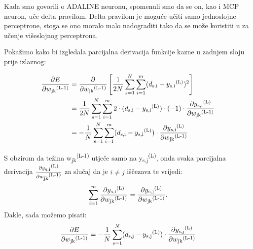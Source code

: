 \documentclass[times, utf8, zavrsni]{fer}
\begin{document}
Kada smo govorili o ADALINE neuronu, spomenuli smo da se on, kao i MCP neuron, uče delta pravilom. Delta pravilom je moguće učiti samo jednoslojne perceptrone, stoga se ono moralo malo nadograditi tako da se može koristiti u za učenje višeslojnog perceptrona.


Pokažimo kako bi izgledala parcijalna derivacija funkcije kazne u zadnjem sloju prije izlaznog:

\begin{align}
    \frac{\partial E}{\partial w\textsubscript{jk}\textsuperscript{(L-1)}} &= \frac{\partial}{\partial w\textsubscript{jk}\textsuperscript{(L-1)}}\left[\frac{1}{2N}\sum\limits_{s=1}^N\sum\limits_{i=1}^m(d\textsubscript{s,i} - y\textsubscript{s,i}\textsuperscript{(L)})^2\right] \\
    &= \frac{1}{2N}\sum\limits_{s=1}^N\sum\limits_{i=1}^m2\cdot{(d\textsubscript{s,i} - y\textsubscript{s,i}\textsuperscript{(L)}}) \cdot{(-1)} \cdot{\frac{\partial y\textsubscript{s,i}\textsuperscript{(L)}}{\partial w\textsubscript{jk}\textsuperscript{(L-1)}}} \\
    &= -\frac{1}{N}\sum\limits_{s=1}^N\sum\limits_{i=1}^m(d\textsubscript{s,i} - y\textsubscript{s,i}\textsuperscript{(L)})\cdot{\frac{\partial y\textsubscript{s,i}\textsuperscript{(L)}}{\partial w\textsubscript{jk}\textsuperscript{(L-1)}}}\label{eq:4-26}
\end{align}

S obzirom da težina w\textsubscript{jk}\textsuperscript{(L-1)} utječe samo na y\textsubscript{s,j}\textsuperscript{(L)}, onda svaka parcijalna derivacija $\frac{\partial y\textsubscript{s,i}\textsuperscript{(L)}}{\partial w\textsubscript{jk}\textsuperscript{(L-1)}}$ za slučaj da je $i\neq{j}$ iščezava te vrijedi:
\[
    \sum\limits_{i=1}^m\frac{\partial y\textsubscript{s,i}\textsuperscript{(L)}}{\partial w\textsubscript{jk}\textsuperscript{(L-1)}} = \frac{\partial y\textsubscript{s,j}\textsuperscript{(L)}}{\partial w\textsubscript{jk}\textsuperscript{(L-1)}}.
\]
Dakle, sada možemo pisati:
\begin{equation}
    \label{eq:4-27}
    \frac{\partial E}{\partial w\textsubscript{jk}\textsuperscript{(L-1)}} = -\frac{1}{N}\sum\limits_{s=1}^N(d\textsubscript{s,j} - y\textsubscript{s,j}\textsuperscript{(L)})\cdot{\frac{\partial y\textsubscript{s,j}\textsuperscript{(L)}}{\partial w\textsubscript{jk}\textsuperscript{(L-1)}}}
\end{equation}
\end{document}
